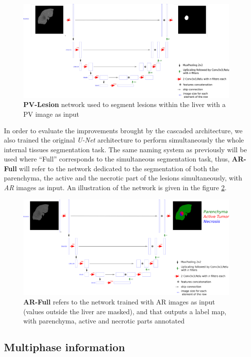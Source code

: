 \documentclass[]{article}
\newcommand{\pplfont}[1]{{\textbf{\fontfamily{ppl}\selectfont #1}}}
\begin{document}
	\begin{figure}[th!]
		\centering
		\includegraphics[width=0.7\linewidth]{images/image16}
		\caption{\pplfont{PV-Lesion} network used to segment lesions within the liver with a PV image as input}
		\label{CARS_PV_lesion_Fig}
	\end{figure}
	
	
	In order to evaluate the improvements brought by the cascaded
	architecture, we also trained the original \emph{U-Net} architecture to
	perform simultaneously the whole internal tissues segmentation task. The
	same naming system as previously will be used where ``Full'' corresponds
	to the simultaneous segmentation task, thus, \pplfont{AR-Full} will refer to the
	network dedicated to the segmentation of both the parenchyma, the active
	and the necrotic part of the lesions simultaneously, with \emph{AR}
	images as input. An illustration of the network is given in the figure
	\ref{CARS_ArFull_Fig}.
	
	\begin{figure}[th!]
		\centering
		\includegraphics[width=0.7\linewidth]{images/image23}
		\caption{\pplfont{AR-Full} refers to the network trained with AR images as input (values outside the liver are masked), and that outputs a label map, with parenchyma, active and necrotic parts annotated}
		\label{CARS_ArFull_Fig}
	\end{figure}
	
	
	\subsection*{Multiphase information}
	
\end{document}
